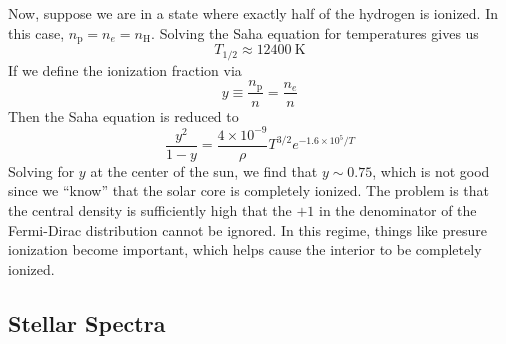 \documentclass[10pt]{article}
\numberwithin{equation}{section}
\begin{document}
    Now, suppose we are in a state where exactly half of the hydrogen
    is ionized. In this case,
    $n_{\mathrm{p}}=n_e=n_\mathrm{H}$. Solving the Saha equation for
    temperatures gives us
    \begin{equation}
      \label{eq:209}
      T_{1/2}\approx 12400\ \mathrm{K}
    \end{equation}
    If we define the ionization fraction via
    \begin{equation}
      \label{eq:210}
      y\equiv \frac{n_\mathrm{p}}{n}=\frac{n_e}{n}
    \end{equation}
    Then the Saha equation is reduced to
    \begin{equation}
      \label{eq:211}
      \boxed{\frac{y^2}{1-y}=\frac{4\times 10^{-9}}{\rho}T^{3/2}e^{-1.6\times 10^5/T}}
    \end{equation}
    Solving for $y$ at the center of the sun, we find that $y\sim
    0.75$, which is not good since we ``know'' that the solar core is
    completely ionized. The problem is that the central density is
    sufficiently high that the $+1$ in the denominator of the
    Fermi-Dirac distribution cannot be ignored. In this regime, things
    like presure ionization become important, which helps cause the
    interior to be completely ionized.

    \subsection{Stellar Spectra}
    \label{sec:stellar-spectra}
\end{document}

